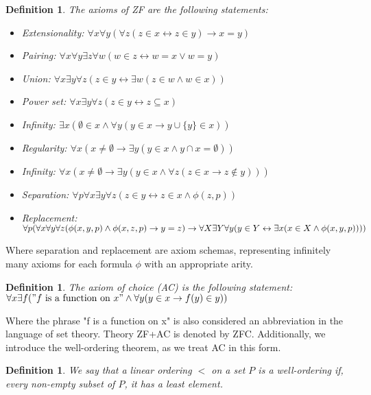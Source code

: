 \documentclass{report}
\newtheorem{dfn}[thm]{Definition}
\begin{document}
\begin{dfn}
  The axioms of ZF are the following statements:
  \begin{itemize}
    \item Extensionality: $\forall x \forall y (\forall z (z \in x \leftrightarrow z \in y) \rightarrow x = y)$
    \item Pairing: $\forall x \forall y \exists z \forall w (w \in z \leftrightarrow w = x \lor w = y)$
    \item Union: $\forall x \exists y \forall z (z \in y \leftrightarrow \exists w (z \in w \land w \in x))$
    \item Power set: $\forall x \exists y \forall z (z \in y \leftrightarrow z \subseteq x)$
    \item Infinity: $\exists x (\emptyset \in x \land \forall y (y \in x \rightarrow y \cup \{y\} \in x))$
    \item Regularity: $\forall x(x \neq \emptyset \rightarrow \exists y (y \in x \land y \cap x = \emptyset))$
    \item Infinity: $\forall x (x \neq \emptyset \rightarrow \exists y (y \in x \land \forall z (z \in x \rightarrow z \notin y)))$
    \item Separation: $\forall p \forall x \exists y \forall z (z \in y \leftrightarrow z \in x \land \phi(z, p))$
    \item Replacement: $\forall p (\forall x \forall y \forall z (\phi(x, y, p) \land \phi(x, z, p) \rightarrow y = z) \rightarrow \\ \forall X \exists Y \forall y (y \in Y \leftrightarrow \exists x (x \in X \land \phi(x, y, p))))$
  \end{itemize}
\end{dfn}
Where separation and replacement are axiom schemas, representing infinitely many axioms for each formula $\phi$ with an appropriate arity.
\begin{dfn} 
  \emph{The axiom of choice (AC)} is the following statement: \\
  $\forall x \exists f (\mathrm{"} f \text{ is a function on } x \mathrm{"} \land \forall y (y \in x \rightarrow f(y) \in y))$
\end{dfn}
Where the phrase "f is a function on x" is also considered an abbreviation in the language of set theory.
Theory ZF+AC is denoted by ZFC.
Additionally, we introduce the well-ordering theorem, as we treat AC in this form.

\begin{dfn}
  We say that a linear ordering $<$ on a set $P$ is a \emph{well-ordering} if, every non-empty subset of $P$, it has a least element.
\end{dfn}
\end{document}
